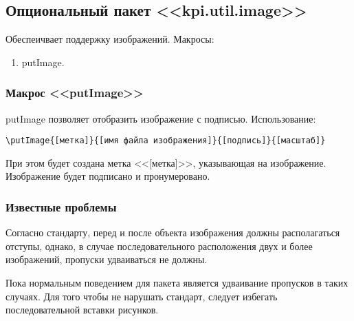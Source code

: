 \subsection{Опциональный пакет <<kpi.util.image>>}
Обеспеичвает поддержку изображений.
Макросы:
\begin{enumerate}
\item putImage.
\end{enumerate}
\subsubsection{Макрос <<putImage>>}
putImage позволяет отобразить изображение с подписью.
Использование:{\small
\begin{Verbatim}
\putImage{[метка]}{[имя файла изображения]}{[подпись]}{[масштаб]}
\end{Verbatim}}
\normalsize
При этом будет создана метка <<[метка]>>, указывающая на изображение. Изображение будет подписано и пронумеровано.

\subsubsection{Известные проблемы}
Согласно стандарту, перед и после объекта изображения должны располагаться отступы, однако, в случае последовательного расположения двух и более изображений, пропуски удваиваться не должны.\par
Пока нормальным поведением для пакета является удваивание пропусков в таких случаях. Для того чтобы не нарушать стандарт, следует избегать последовательной вставки рисунков.